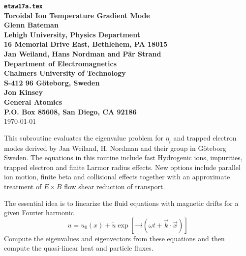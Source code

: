 
\headheight 0pt \headsep 0pt          
\topmargin 0pt  \textheight 9.0in
\oddsidemargin 0pt \textwidth 6.5in

\newcommand{\Partial}[2]{\frac{\partial #1}{\partial #2}}
\newcommand{\jacobian}{{\cal J}}



\begin{center} 
{\bf {\tt etaw17a.tex} \\
Toroidal Ion Temperature Gradient Mode \\
\vspace{1pc}
Glenn Bateman \\
Lehigh University, Physics Department \\
16 Memorial Drive East, Bethlehem, PA 18015 \\
\vspace{1pc}
Jan Weiland, Hans Nordman and P{\"a}r Strand\\
Department of Electromagnetics \\
Chalmers University of Technology \\
S-412 96 G\"{o}teborg, Sweden \\
\vspace{1pc}
Jon Kinsey \\
General Atomics \\
P.O. Box 85608, San Diego, CA 92186} \\ 
\vspace{1pc}
\today
\end{center}
This subroutine evaluates the eigenvalue problem for $\eta_i$
and trapped electron modes derived by 
Jan Weiland, H. Nordman and their group in G\"{o}teborg Sweden.
The equations in this routine include fast Hydrogenic ions,
impurities, trapped electron and finite Larmor radius effects.
New options include parallel ion motion, finite beta and collisional effects
together with an approximate treatment of $E\times B$ flow shear reduction of 
transport.

The essential idea is to linearize the fluid equations 
with magnetic drifts for a given Fourier harmonic
\[ u = u_0(x) + \tilde{u} \exp\left[ -i (\omega t
   + \vec{k} \cdot \vec{x} ) \right] \]
Compute the eigenvalues and eigenvectors from these equations and then
compute the quasi-linear heat and particle fluxes.


